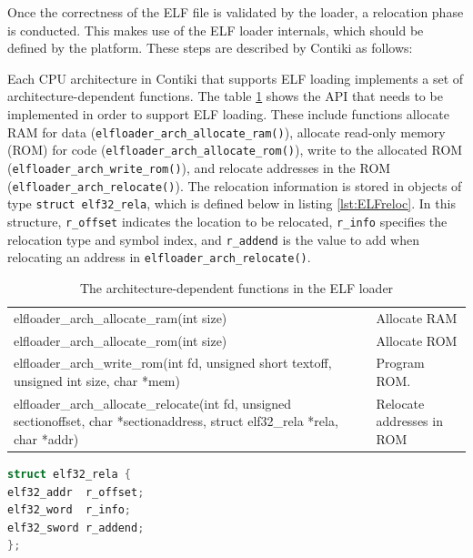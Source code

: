 Once the correctness of the ELF file is validated by the loader, a relocation phase is conducted.
This makes use of the ELF loader internals, which should be defined by the platform.
These steps are described by Contiki as follows:
\begin{citeverbatim}
	Each CPU architecture in Contiki that supports ELF loading implements a set of architecture-dependent functions. 
	The table \ref{tab:loaderFunc} shows the API that needs to be implemented in order to support ELF loading. 
	These include functions allocate RAM for data (\texttt{elfloader\_arch\_allocate\_ram()}), allocate read-only memory (ROM) for code (\texttt{elfloader\_arch\_allocate\_rom()}), write to the allocated ROM (\texttt{elfloader\_arch\_write\_rom()}), and relocate addresses in the ROM (\texttt{elfloader\_arch\_relocate()}). 
	The relocation information is stored in objects of type \texttt{struct elf32\_rela}, which is defined below in listing \ref{lst:ELFreloc}. 
	In this structure, \texttt{r\_offset} indicates the location to be relocated, \texttt{r\_info} specifies the relocation type and symbol index, and \texttt{r\_addend} is the value to add when relocating an address in \texttt{elfloader\_arch\_relocate()}.
\end{citeverbatim}

\begin{table}[htb]
	\centering
	\scriptsize
	\caption{The architecture-dependent functions in the ELF loader}
	\label{tab:loaderFunc}
	\begin{tabular}{p{9cm}l}
		elfloader\_arch\_allocate\_ram(int size)                                                                                        & Allocate RAM              \\
		elfloader\_arch\_allocate\_rom(int size)                                                                                        & Allocate ROM              \\
		elfloader\_arch\_write\_rom(int fd, unsigned short textoff, unsigned int size, char *mem)                                       & Program ROM.              \\
		elfloader\_arch\_allocate\_relocate(int fd, unsigned sectionoffset, char *sectionaddress, struct elf32\_rela *rela, char *addr) & Relocate addresses in ROM
	\end{tabular}
\end{table}

\begin{lstlisting}[language=C, caption=The 32-bit ELF relocation structure, label=lst:ELFreloc]
struct elf32_rela {
elf32_addr	r_offset;
elf32_word	r_info;
elf32_sword	r_addend;
};
\end{lstlisting}

